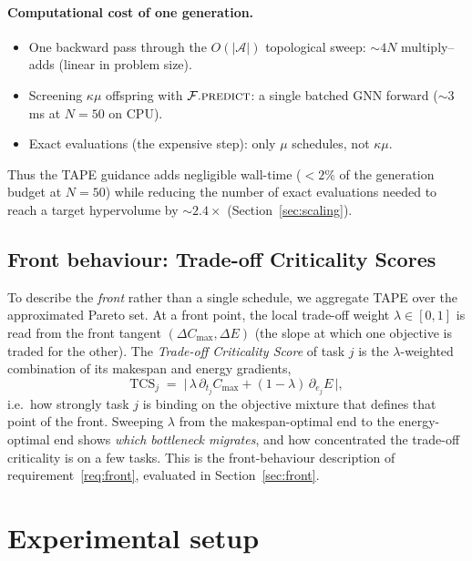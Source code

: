 \documentclass[11pt]{article}
\newcommand{\Cmax}{C_{\max}}
\begin{document}
\paragraph{Computational cost of one generation.}
\begin{itemize}[nosep,leftmargin=*]
\item One backward pass through the $O(|\mathcal A|)$ topological sweep: $\sim\!4N$ multiply--adds (linear in problem size).
\item Screening $\kappa\mu$ offspring with $\mathcal F.\textsc{predict}$: a single batched GNN forward ($\sim\!3$ ms at $N{=}50$ on CPU).
\item Exact evaluations (the expensive step): only $\mu$ schedules, not $\kappa\mu$.
\end{itemize}
Thus the TAPE guidance adds negligible wall-time ($<\!2\%$ of the generation budget at
$N{=}50$) while reducing the number of exact evaluations needed to reach a target
hypervolume by $\sim\!2.4\times$ (Section~\ref{sec:scaling}).

\subsection{Front behaviour: Trade-off Criticality Scores}
\label{sec:pts}
To describe the \emph{front} rather than a single schedule, we aggregate TAPE over the
approximated Pareto set. At a front point, the local trade-off weight $\lambda\in[0,1]$ is
read from the front tangent $(\Delta \Cmax,\Delta E)$ (the slope at which one objective is
traded for the other). The \emph{Trade-off Criticality Score} of task $j$ is the
$\lambda$-weighted combination of its makespan and energy gradients,
\begin{equation}
\mathrm{TCS}_j \;=\; \big|\,\lambda\,\partial_{t_j}\Cmax + (1-\lambda)\,\partial_{e_j}E\,\big| ,
\end{equation}
i.e.\ how strongly task $j$ is binding on the objective mixture that defines that point of
the front. Sweeping $\lambda$ from the makespan-optimal end to the
energy-optimal end shows \emph{which bottleneck migrates}, and how concentrated the trade-off criticality
is on a few tasks. This is the front-behaviour description of requirement~\ref{req:front},
evaluated in Section~\ref{sec:front}.

\section{Experimental setup}
\label{sec:setup}
\end{document}
